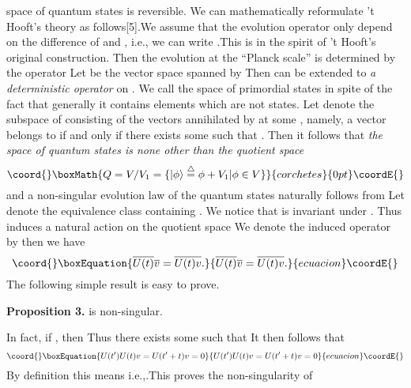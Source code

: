 \documentclass[a4paper,12pt]{article}
\begin{document}
space of quantum states is reversible. We can mathematically reformulate 't
Hooft's theory as follows[5].We assume that the evolution operator \coordHE{} only depend on the difference of \coordHE{}and \coordHE{}, i.e., we can
write \coordHE{} .This is in the spirit of 't Hooft's original
construction. Then the evolution at the ``Planck scale'' is determined by
the operator \coordHE{} Let \coordHE{} be the vector
space spanned by \coordHE{}Then \coordHE{} can be extended to \textit{%
a deterministic operator} on \coordHE{}. We call \coordHE{} the space of primordial states
in spite of the fact that generally it contains elements which are not
states. Let \coordHE{} denote the subspace of \coordHE{} consisting of the vectors
annihilated by \coordHE{} at some \coordHE{}, namely, a vector \coordHE{} belongs to \coordHE{}if
and only if there exists some \coordHE{} such that \coordHE{}. Then it follows
that \textit{the space of quantum states is none other than the quotient
space }
\[\coord{}\boxMath{
Q=V/V_1=\{|\phi \rangle \stackrel{\triangle}{=} \phi +V_1|\phi \in V\}
}{corchetes}{0pt}\coordE{}\]
and a non-singular evolution law of the quantum states naturally follows
from \coordHE{} Let \coordHE{}  \myHighlight{$\equiv |\nu \rangle $}\coordHE{} denote the
equivalence class containing \coordHE{} . We notice that \coordHE{}is invariant under \coordHE{}. Thus \coordHE{} induces a natural action on the quotient space \coordHE{}We
denote the induced operator by \coordHE{} then we have
\begin{equation}\coord{}\boxEquation{
\overline{U(t)}\overline{v}=\overline{U(t)v}.
}{
\overline{U(t)}\overline{v}=\overline{U(t)v}.
}{ecuacion}\coordE{}\end{equation}
The following simple result is easy to prove.

\textbf{Proposition 3.} \coordHE{} is non-singular.

In fact, if \coordHE{} , then \coordHE{}%
Thus there exists some \coordHE{} such that \coordHE{}It
then follows that
\begin{equation}\coord{}\boxEquation{
U(t^{\prime })U(t)v=U(t^{\prime }+t)v=0
}{
U(t^{\prime })U(t)v=U(t^{\prime }+t)v=0
}{ecuacion}\coordE{}\end{equation}
By definition this means \coordHE{}i.e.,\coordHE{}.This
proves the non-singularity of \coordHE{}
\end{document}
